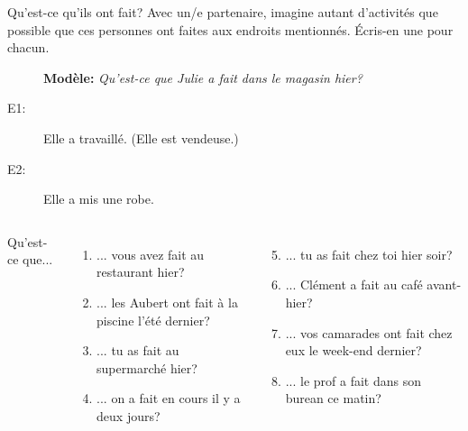 \begin{frame}{Qu'est-ce qu'ils ont fait?}
  \small
  Avec un/e partenaire, imagine autant d'activités que possible que ces personnes ont faites aux endroits mentionnés.
  Écris-en une pour chacun. \\
  \begin{description}
    \item[] \textbf{Modèle:} \emph{Qu'est-ce que Julie a fait dans le magasin hier?}
    \item[E1:] Elle a travaillé. (Elle est vendeuse.)
    \item[E2:] Elle a mis une robe.
  \end{description}
  \begin{columns}[t]
      Qu'est-ce que...
      \begin{enumerate}
        \item ... vous avez fait au restaurant hier?
        \item ... les Aubert ont fait à la piscine l'été dernier?
        \item ... tu as fait au supermarché hier?
        \item ... on a fait en cours il y a deux jours?
      \end{enumerate}
      \begin{enumerate}
        \setcounter{enumi}{4}
        \item ... tu as fait chez toi hier soir?
        \item ... Clément a fait au café avant-hier?
        \item ... vos camarades ont fait chez eux le week-end dernier?
        \item ... le prof a fait dans son burean ce matin?
      \end{enumerate}
  \end{columns}
\end{frame}